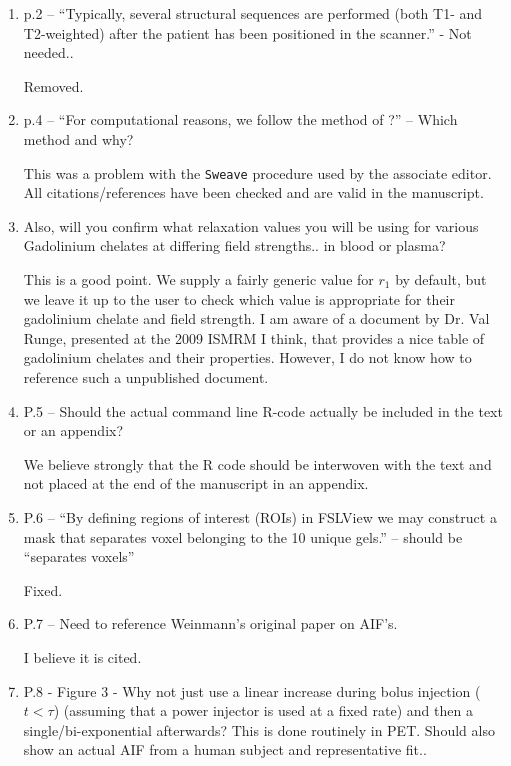\documentclass[11pt]{article}
\begin{document}
\begin{enumerate}
\item p.2 – ``Typically, several structural sequences are performed
  (both T1- and T2-weighted) after the patient has been positioned in
  the scanner.'' - Not needed..

  Removed.

\item p.4 – ``For computational reasons, we follow the method of ?'' –
  Which method and why?

  This was a problem with the \texttt{Sweave} procedure used by the
  associate editor.  All citations/references have been checked and
  are valid in the manuscript.

\item Also, will you confirm what relaxation values you will be using
  for various Gadolinium chelates at differing field strengths.. in
  blood or plasma?

  This is a good point.  We supply a fairly generic value for $r_1$ by
  default, but we leave it up to the user to check which value is
  appropriate for their gadolinium chelate and field strength.  I am
  aware of a document by Dr. Val Runge, presented at the 2009 ISMRM I
  think, that provides a nice table of gadolinium chelates and their
  properties.  However, I do not know how to reference such a
  unpublished document.

\item P.5 – Should the actual command line R-code actually be included
  in the text or an appendix?

  We believe strongly that the \textsf{R} code should be interwoven
  with the text and not placed at the end of the manuscript in an
  appendix.

\item P.6 – ``By defining regions of interest (ROIs) in FSLView we may
  construct a mask that separates voxel belonging to the 10 unique
  gels.'' – should be ``separates voxels''

  Fixed.

\item P.7 – Need to reference Weinmann’s original paper on AIF's.

  I believe it is cited.

\item P.8 - Figure 3 - Why not just use a linear increase during bolus
  injection ($t<\tau$) (assuming that a power injector is used at a
  fixed rate) and then a single/bi-exponential afterwards?  This is
  done routinely in PET.  Should also show an actual AIF from a human
  subject and representative fit..


\end{enumerate}
\end{document}
